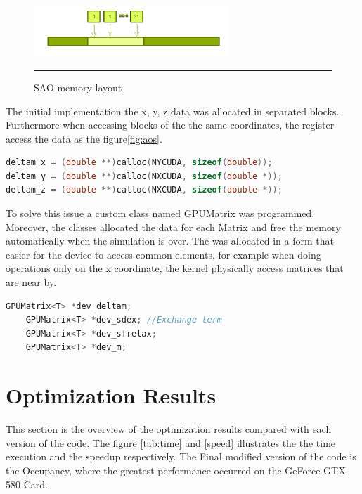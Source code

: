 \begin{figure}[htbp]
	\centering
		\includegraphics[width=0.65\textwidth]{Figures/soa.png}
		\rule{35em}{0.2pt}
	\caption[Structure of Arrays (SAO)]{SAO memory layout}
	\label{fig:sao}
\end{figure}


The initial implementation the  x, y, z data was allocated in separated blocks. Furthermore when accessing blocks of the the same coordinates, the register access the data as the figure\ref{fig:aos}.

\begin{lstlisting}[language=C++, caption={AOS implementation}]
deltam_x = (double **)calloc(NYCUDA, sizeof(double));
deltam_y = (double **)calloc(NXCUDA, sizeof(double *));
deltam_z = (double **)calloc(NXCUDA, sizeof(double *));
\end{lstlisting}

To solve this issue a custom class named GPUMatrix was programmed. Moreover, the classes allocated the data for each Matrix and free the memory automatically when the simulation is over. The was allocated in a form that easier for the device to access common elements, for example when doing operations only on the x coordinate, the kernel physically access matrices that are near by.

\begin{lstlisting}[language=C++, caption={SOA implementation}]
    GPUMatrix<T> *dev_deltam;
    GPUMatrix<T> *dev_sdex; //Exchange term
    GPUMatrix<T> *dev_sfrelax;
    GPUMatrix<T> *dev_m; 
\end{lstlisting}


\section{Optimization Results}

This section is the overview of the optimization results compared with each version of the code. The figure \ref{tab:time} and \ref{speed} illustrates the the time execution and the speedup respectively. The Final modified version of the code is the Occupancy, where the greatest performance occurred on the GeForce GTX 580 Card.

